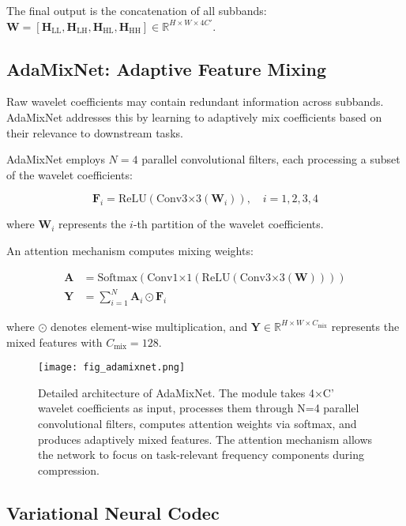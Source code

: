 \documentclass[conference]{IEEEtran}
\begin{document}
The final output is the concatenation of all subbands: $\mathbf{W} = [\mathbf{H}_{\text{LL}}, \mathbf{H}_{\text{LH}}, \mathbf{H}_{\text{HL}}, \mathbf{H}_{\text{HH}}] \in \mathbb{R}^{H \times W \times 4C'}$.

\subsection{AdaMixNet: Adaptive Feature Mixing}

Raw wavelet coefficients may contain redundant information across subbands. AdaMixNet addresses this by learning to adaptively mix coefficients based on their relevance to downstream tasks.

AdaMixNet employs $N=4$ parallel convolutional filters, each processing a subset of the wavelet coefficients:

\begin{equation}
\mathbf{F}_i = \text{ReLU}(\text{Conv3×3}(\mathbf{W}_{i})), \quad i = 1, 2, 3, 4
\end{equation}

where $\mathbf{W}_i$ represents the $i$-th partition of the wavelet coefficients.

An attention mechanism computes mixing weights:

\begin{align}
\mathbf{A} &= \text{Softmax}(\text{Conv1×1}(\text{ReLU}(\text{Conv3×3}(\mathbf{W})))) \\
\mathbf{Y} &= \sum_{i=1}^{N} \mathbf{A}_i \odot \mathbf{F}_i
\end{align}

where $\odot$ denotes element-wise multiplication, and $\mathbf{Y} \in \mathbb{R}^{H \times W \times C_{\text{mix}}}$ represents the mixed features with $C_{\text{mix}} = 128$.

\begin{figure}[htbp]
\centerline{\texttt{[image: fig\_adamixnet.png]}}
\caption{Detailed architecture of AdaMixNet. The module takes 4×C' wavelet coefficients as input, processes them through N=4 parallel convolutional filters, computes attention weights via softmax, and produces adaptively mixed features. The attention mechanism allows the network to focus on task-relevant frequency components during compression.}
\label{fig:adamixnet}
\end{figure}

\subsection{Variational Neural Codec}
\end{document}
